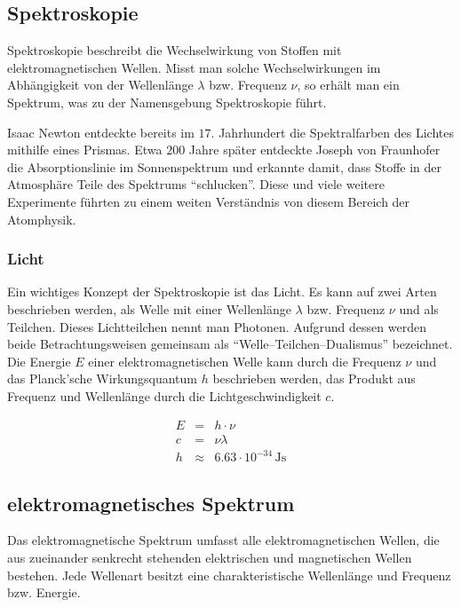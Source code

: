 \documentclass[12pt,a4paper]{scrartcl}
\numberwithin{equation}{section} %
\begin{document}
\subsection{Spektroskopie}
\label{Spektroskopie}
Spektroskopie beschreibt die Wechselwirkung von Stoffen mit elektromagnetischen Wellen. Misst man solche Wechselwirkungen im Abhängigkeit von der Wellenlänge $\lambda$ bzw. Frequenz $\nu$, so erhält man ein Spektrum, was zu der Namensgebung Spektroskopie führt.

Isaac Newton entdeckte bereits im $17.$ Jahrhundert die Spektralfarben des Lichtes mithilfe eines Prismas. Etwa $200$ Jahre später entdeckte Joseph von Fraunhofer die Absorptionslinie im Sonnenspektrum und erkannte damit, dass Stoffe in der Atmosphäre Teile des Spektrums ``schlucken''. Diese und viele weitere Experimente führten zu einem weiten Verständnis von diesem Bereich der Atomphysik.

\subsubsection{Licht}
\label{Licht}
Ein wichtiges Konzept der Spektroskopie ist das Licht. Es kann auf zwei Arten beschrieben werden, als Welle mit einer Wellenlänge $\lambda$ bzw. Frequenz $\nu$ und als Teilchen. Dieses Lichtteilchen nennt man Photonen. Aufgrund dessen werden beide Betrachtungsweisen gemeinsam als ``Welle--Teilchen--Dualismus'' bezeichnet. Die Energie $E$ einer elektromagnetischen Welle kann durch die Frequenz $\nu$ und das Planck'sche Wirkungsquantum $h$ beschrieben werden, das Produkt aus Frequenz und Wellenlänge durch die Lichtgeschwindigkeit $c$.

\begin{eqnarray}
  E &=& h \cdot \nu \label{eq:Energie Photon} \\
  c &=& \nu\lambda \\
  h &\approx& 6.63 \cdot 10^{-34} \mathrm{\,Js}
\end{eqnarray}

\hypertarget{elektromagnetisches-spektrum}{\subsection{elektromagnetisches Spektrum}\label{elektromagnetisches-spektrum}}
Das elektromagnetische Spektrum umfasst alle elektromagnetischen Wellen, die aus zueinander senkrecht stehenden elektrischen und magnetischen Wellen bestehen. Jede Wellenart besitzt eine charakteristische Wellenlänge und Frequenz bzw. Energie.
\end{document}
